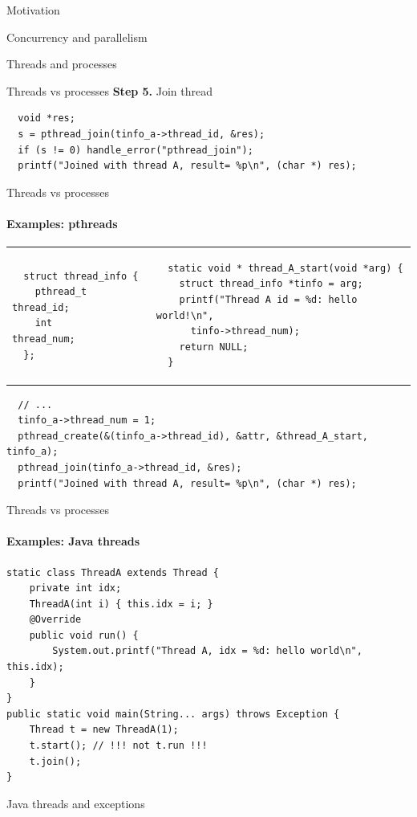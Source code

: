 \begin{section}{Motivation}
\begin{section}{Concurrency and parallelism}
\begin{section}{Threads and processes}
\begin{frame}{Threads vs processes}
\textbf{Step 5.} Join thread
\begin{verbatim}
  void *res;
  s = pthread_join(tinfo_a->thread_id, &res);
  if (s != 0) handle_error("pthread_join");
  printf("Joined with thread A, result= %p\n", (char *) res);
\end{verbatim}
\end{frame}

\begin{frame}{Threads vs processes}
\framesubtitle{Examples: pthreads}

\begin{tabular}{p{5cm}p{5cm}}

\begin{verbatim}
  struct thread_info {
    pthread_t thread_id;
    int       thread_num;
  };
\end{verbatim}
 & 
\begin{verbatim}
  static void * thread_A_start(void *arg) {
    struct thread_info *tinfo = arg;
    printf("Thread A id = %d: hello world!\n", 
      tinfo->thread_num);
    return NULL;
  }
\end{verbatim}
\end{tabular}

\begin{verbatim}
  // ...
  tinfo_a->thread_num = 1;
  pthread_create(&(tinfo_a->thread_id), &attr, &thread_A_start, tinfo_a);
  pthread_join(tinfo_a->thread_id, &res);
  printf("Joined with thread A, result= %p\n", (char *) res);
\end{verbatim}

\end{frame}


\begin{frame}[fragile]{Threads vs processes}
\framesubtitle{Examples: Java threads}

\begin{verbatim}
static class ThreadA extends Thread {
    private int idx;        
    ThreadA(int i) { this.idx = i; }
    @Override
    public void run() {
        System.out.printf("Thread A, idx = %d: hello world\n", this.idx);
    }
}
public static void main(String... args) throws Exception {
    Thread t = new ThreadA(1);
    t.start(); // !!! not t.run !!!
    t.join();
}
\end{verbatim}
\end{frame}


\begin{frame}[fragile]{Java threads and exceptions}


\end{frame}
\end{section}
\end{section}
\end{section}

